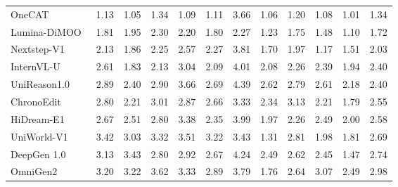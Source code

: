 \begin{table}[t]
{\begin{tabular}{l|cccccccccc|c}
            \midrule

            OneCAT~\cite{li2025onecat}
            & 1.13 & 1.05 & 1.34 & 1.09 & 1.11 & 3.66 & 1.06 & 1.20 & 1.08 & 1.01
            & \cellcolor[HTML]{C8C8C8}1.34 \\

            
            Lumina-DiMOO~\cite{xin2025lumina}
            & 1.81 & 1.95 & 2.30 & 2.20 & 1.80 & 2.27 & 1.23 & 1.75 &  1.48 & 1.10
            & \cellcolor[HTML]{C8C8C8}1.72 \\

            Nextstep-V1~\cite{han2025nextstep}
            & 2.13 & 1.86 & 2.25 & 2.57 & 2.27 & 3.81 & 1.70 & 1.97 & 1.17 & 1.51
            & \cellcolor[HTML]{C8C8C8}2.03 \\


            InternVL-U~\cite{tian2026internvl}
            & 2.61 & 1.83 & 2.13 & 3.04 & 2.09 & 4.01 & 2.08 & 2.26 & 2.39 & 1.94
            & \cellcolor[HTML]{C8C8C8}2.40 \\

            UniReason1.0~\cite{wang2026unireason}
            & 2.89 & 2.40 & 2.90 & 3.66 & 2.69 & 4.39 & 2.62 & 2.79 & 2.61 & 2.18
            & \cellcolor[HTML]{C8C8C8}2.40 \\

            ChronoEdit~\cite{wu2025chronoedit}
            & 2.80 & 2.21 & 3.01 & 2.87 & 2.66 & 3.33 & 2.34 & 3.13 & 2.21 & 1.79
            & \cellcolor[HTML]{C8C8C8}2.55 \\
            
            HiDream-E1~\cite{cai2025hidream}
            & 2.67 & 2.51 & 2.80 & 3.38 & 2.35 & 3.99 & 1.97 & 2.26 & 2.49 & 2.00
            & \cellcolor[HTML]{C8C8C8}2.58 \\

            
            UniWorld-V1~\cite{lin2025uniworld}
            & 3.42 & 3.03 & 3.32 & 3.51 & 3.22 & 3.43 & 1.31 & 2.81 & 1.98 & 1.81
            & \cellcolor[HTML]{C8C8C8}2.69 \\
            
            

            DeepGen 1.0~\cite{wang2026deepgen}
            & 3.13 & 3.43 & 2.80 & 2.92 & 2.67 & 4.24 & 2.49 & 2.62 & 2.45 & 1.47
            & \cellcolor[HTML]{C8C8C8}2.74 \\


            OmniGen2~\cite{wu2025omnigen2}
            & 3.20 & 3.22 & 3.62 & 3.33 & 2.89 & 3.79 & 1.76 & 2.64 & 3.07 & 2.49
            & \cellcolor[HTML]{C8C8C8}2.98 \\


\end{tabular}}
\end{table}

